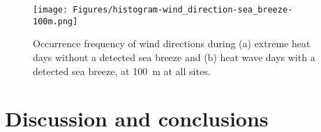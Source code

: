 \begin{figure}[ht]
	\centering
	\texttt{[image: Figures/histogram-wind\_direction-sea\_breeze-100m.png]}
	\caption{Occurrence frequency of wind directions during (a) extreme heat days without a detected sea breeze and (b) heat wave days with a detected sea breeze, at \SI{100}{\meter} at all sites.}
	\label{fig:wind_direction-heat_wave-sea_breeze-histogram}
\end{figure}

\FloatBarrier

\section{Discussion and conclusions} \label{section:discussion_conclusion}

